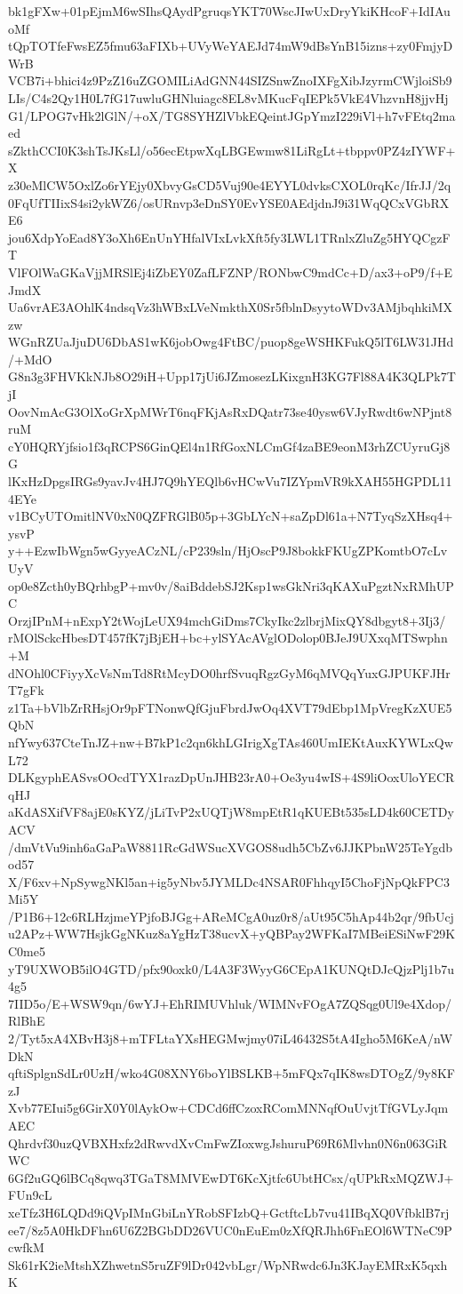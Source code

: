 bk1gFXw+01pEjmM6wSIhsQAydPgruqsYKT70WscJIwUxDryYkiKHcoF+IdIAuoMf
tQpTOTfeFwsEZ5fmu63aFIXb+UVyWeYAEJd74mW9dBsYnB15izns+zy0FmjyDWrB
VCB7i+bhici4z9PzZ16uZGOMILiAdGNN44SIZSnwZnoIXFgXibJzyrmCWjloiSb9
LIs/C4s2Qy1H0L7fG17uwluGHNluiagc8EL8vMKucFqIEPk5VkE4VhzvnH8jjvHj
G1/LPOG7vHk2lGlN/+oX/TG8SYHZlVbkEQeintJGpYmzI229iVl+h7vFEtq2maed
sZkthCCI0K3shTsJKsLl/o56ecEtpwXqLBGEwmw81LiRgLt+tbppv0PZ4zIYWF+X
z30eMlCW5OxlZo6rYEjy0XbvyGsCD5Vuj90e4EYYL0dvksCXOL0rqKc/IfrJJ/2q
0FqUfTIIixS4si2ykWZ6/osURnvp3eDnSY0EvYSE0AEdjdnJ9i31WqQCxVGbRXE6
jou6XdpYoEad8Y3oXh6EnUnYHfalVIxLvkXft5fy3LWL1TRnlxZluZg5HYQCgzFT
VlFOlWaGKaVjjMRSlEj4iZbEY0ZafLFZNP/RONbwC9mdCc+D/ax3+oP9/f+EJmdX
Ua6vrAE3AOhlK4ndsqVz3hWBxLVeNmkthX0Sr5fblnDsyytoWDv3AMjbqhkiMXzw
WGnRZUaJjuDU6DbAS1wK6jobOwg4FtBC/puop8geWSHKFukQ5lT6LW31JHd/+MdO
G8n3g3FHVKkNJb8O29iH+Upp17jUi6JZmosezLKixgnH3KG7Fl88A4K3QLPk7TjI
OovNmAcG3OlXoGrXpMWrT6nqFKjAsRxDQatr73se40ysw6VJyRwdt6wNPjnt8ruM
cY0HQRYjfsio1f3qRCPS6GinQEl4n1RfGoxNLCmGf4zaBE9eonM3rhZCUyruGj8G
lKxHzDpgsIRGs9yavJv4HJ7Q9hYEQlb6vHCwVu7IZYpmVR9kXAH55HGPDL114EYe
v1BCyUTOmitlNV0xN0QZFRGlB05p+3GbLYcN+saZpDl61a+N7TyqSzXHsq4+ysvP
y++EzwIbWgn5wGyyeACzNL/cP239sln/HjOscP9J8bokkFKUgZPKomtbO7cLvUyV
op0e8Zcth0yBQrhbgP+mv0v/8aiBddebSJ2Ksp1wsGkNri3qKAXuPgztNxRMhUPC
OrzjIPnM+nExpY2tWojLeUX94mchGiDms7CkyIkc2zlbrjMixQY8dbgyt8+3Ij3/
rMOlSckcHbesDT457fK7jBjEH+bc+ylSYAcAVglODolop0BJeJ9UXxqMTSwphn+M
dNOhl0CFiyyXcVsNmTd8RtMcyDO0hrfSvuqRgzGyM6qMVQqYuxGJPUKFJHrT7gFk
z1Ta+bVlbZrRHsjOr9pFTNonwQfGjuFbrdJwOq4XVT79dEbp1MpVregKzXUE5QbN
nfYwy637CteTnJZ+nw+B7kP1c2qn6khLGIrigXgTAs460UmIEKtAuxKYWLxQwL72
DLKgyphEASvsOOcdTYX1razDpUnJHB23rA0+Oe3yu4wIS+4S9liOoxUloYECRqHJ
aKdASXifVF8ajE0sKYZ/jLiTvP2xUQTjW8mpEtR1qKUEBt535sLD4k60CETDyACV
/dmVtVu9inh6aGaPaW8811RcGdWSucXVGOS8udh5CbZv6JJKPbnW25TeYgdbod57
X/F6xv+NpSywgNKl5an+ig5yNbv5JYMLDc4NSAR0FhhqyI5ChoFjNpQkFPC3Mi5Y
/P1B6+12c6RLHzjmeYPjfoBJGg+AReMCgA0uz0r8/aUt95C5hAp44b2qr/9fbUcj
u2APz+WW7HsjkGgNKuz8aYgHzT38ucvX+yQBPay2WFKaI7MBeiESiNwF29KC0me5
yT9UXWOB5ilO4GTD/pfx90oxk0/L4A3F3WyyG6CEpA1KUNQtDJcQjzPlj1b7u4g5
7IID5o/E+WSW9qn/6wYJ+EhRIMUVhluk/WIMNvFOgA7ZQSqg0Ul9e4Xdop/RlBhE
2/Tyt5xA4XBvH3j8+mTFLtaYXsHEGMwjmy07iL46432S5tA4Igho5M6KeA/nWDkN
qftiSplgnSdLr0UzH/wko4G08XNY6boYlBSLKB+5mFQx7qIK8wsDTOgZ/9y8KFzJ
Xvb77EIui5g6GirX0Y0lAykOw+CDCd6ffCzoxRComMNNqfOuUvjtTfGVLyJqmAEC
Qhrdvf30uzQVBXHxfz2dRwvdXvCmFwZIoxwgJshuruP69R6Mlvhn0N6n063GiRWC
6Gf2uGQ6lBCq8qwq3TGaT8MMVEwDT6KcXjtfc6UbtHCsx/qUPkRxMQZWJ+FUn9cL
xeTfz3H6LQDd9iQVpIMnGbiLnYRobSFIzbQ+GctftcLb7vu41IBqXQ0VfbklB7rj
ee7/8z5A0HkDFhn6U6Z2BGbDD26VUC0nEuEm0zXfQRJhh6FnEOl6WTNeC9PcwfkM
Sk61rK2ieMtshXZhwetnS5ruZF9lDr042vbLgr/WpNRwdc6Jn3KJayEMRxK5qxhK
